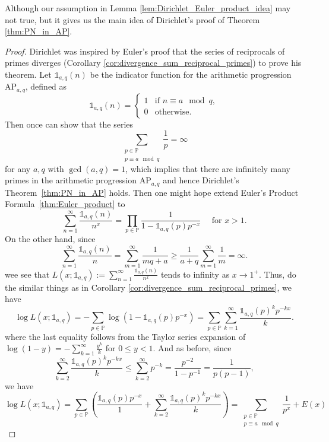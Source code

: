 \documentclass{elegantbook}
\begin{document}
\begin{note}
  Although our assumption in Lemma \ref{lem:Dirichlet_Euler_product_idea} may not true, but it gives us the main idea of Dirichlet's proof of Theorem \ref{thm:PN_in_AP}.
\end{note}

\begin{proof}
  Dirichlet was inspired by Euler's proof that the series of reciprocals of primes diverges (Corollary \ref{cor:divergence_sum_reciprocal_primes}) to prove his theorem. Let $\mathds{1}_{a,q}(n)$ be the indicator function for the arithmetic progression $\mathrm{AP}_{a,q}$, defined as
  \[
    \mathds{1}_{a,q}(n) = \begin{cases} 1 & \text{if } n \equiv a \mod q, \\ 0 & \text{otherwise}. \end{cases}
  \]
  Then once can show that the series
  \[
    \sum_{\substack{p \in \mathbb{P} \\ p \equiv a \mod q}} \frac{1}{p} = \infty
  \]
  for any $a, q$ with $\gcd(a, q) = 1$, which implies that there are infinitely many primes in the arithmetic progression $\mathrm{AP}_{a,q}$ and hence Dirichlet's Theorem~\ref{thm:PN_in_AP} holds. Then one might hope extend Euler's Product Formula~\ref{thm:Euler_product} to
  \[
    \sum_{n=1}^{\infty} \frac{\mathds{1}_{a,q}(n)}{n^x} = \prod_{p\in \mathbb{P}} \frac{1}{1 - \mathds{1}_{a,q}(p) p^{-x}} \quad \text{ for } x > 1.
  \]
  On the other hand, since
  \[
    \sum_{n=1}^{\infty} \frac{\mathds{1}_{a,q}(n)}{n} = \sum_{m=1}^{\infty} \frac{1}{mq + a} \geq \frac{1}{a+q}\sum_{m=1}^{\infty} \frac{1}{m} = \infty.
  \]
  wee see that $L(x;\mathds{1}_{a,q}):= \sum_{n=1}^{\infty} \frac{\mathds{1}_{a,q}(n)}{n^x}$ tends to infinity as $x \to 1^+$. Thus, do the similar things as in Corollary \ref{cor:divergence_sum_reciprocal_primes}, we have
  \[
    \log L(x;\mathds{1}_{a,q}) = -\sum_{p \in \mathbb{P}} \log(1 - \mathds{1}_{a,q}(p) p^{-x}) = \sum_{p \in \mathbb{P}} \sum_{k=1}^{\infty} \frac{\mathds{1}_{a,q}(p)^k p^{-kx}}{k}.
  \]
  where the last equality follows from the Taylor series expansion of $\log(1 - y) = -\sum_{k=1}^{\infty} \frac{y^k}{k}$ for $0 \leq y < 1$. And as before, since
  \[
    \sum_{k=2}^{\infty} \frac{\mathds{1}_{a,q}(p)^k p^{-kx}}{k} \leq \sum_{k=2}^{\infty} p^{-k} = \frac{p^{-2}}{1 - p^{-1}} = \frac{1}{p(p-1)},
  \]
  we have
  \begin{equation} \label{eq:log_L_function_AP_idea}
    \log L(x;\mathds{1}_{a,q}) = \sum_{p \in \mathbb{P}} \left( \frac{\mathds{1}_{a,q}(p) p^{-x}}{1} + \sum_{k=2}^{\infty} \frac{\mathds{1}_{a,q}(p)^k p^{-kx}}{k} \right) = \sum_{\substack{p \in \mathbb{P} \\ p \equiv a \mod q}} \frac{1}{p^x} + E(x)

\end{equation}
\end{proof}
\end{document}
